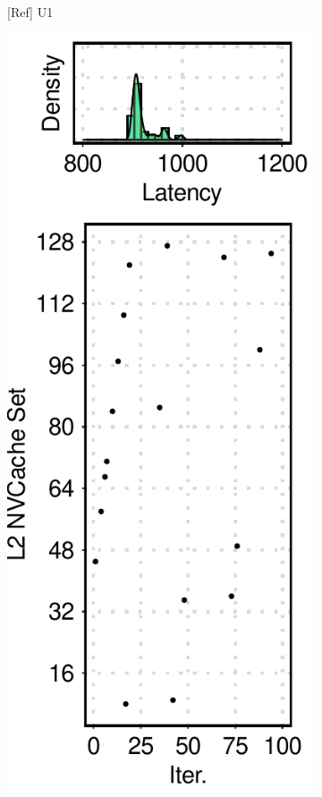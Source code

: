\begin{figure}[t]
\begin{subfigure}[b]{.12\textwidth}
        \caption{[Ref] U1}
        \label{fig:12:ref:side-channel-feature-u1}
    \end{subfigure}
    \hfill
    \begin{subfigure}[b]{.12\textwidth}
        \centering
        \includegraphics[width=\linewidth]{figure/plot/reference/fig12-side-sql-u2.pdf}

\end{subfigure}
\end{figure}

